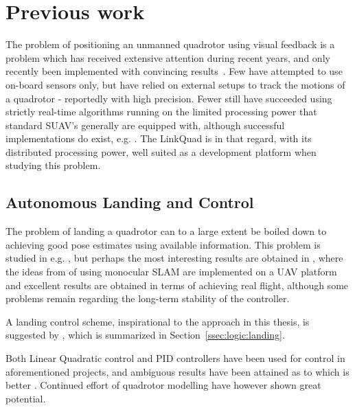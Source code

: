 \section{Previous work}
\label{sec:previouswork}

    The problem of positioning an unmanned quadrotor using
    visual feedback is a problem which has received extensive attention
    during recent years, and only recently been implemented with convincing
    results~\citep{DBLP:conf/icra/BloschWSS10,weiss11monocular}.
    Few have attempted to use on-board sensors only, but have relied on
    external setups to track the motions of a quadrotor - reportedly with high precision.
    Fewer still have succeeded using strictly real-time algorithms
    running on the limited processing power that standard
    SUAV's generally are equipped with, although successful implementations do exist, e.g. \citep{Rudol10}.
    The LinkQuad is in that regard, with its distributed processing power, well suited
    as a development platform when studying this problem.

    \subsection{Autonomous Landing and Control}
    The problem of landing a quadrotor can to a large extent be boiled
    down to achieving good pose estimates using available information.
    This problem is studied in e.g. \citep{mellinger10perching,brockers:803111},
    but perhaps the most interesting results are obtained in \citep{DBLP:conf/icra/BloschWSS10,weiss11monocular},
    where the ideas from \citep{klein07parallel} of using monocular SLAM
    are implemented on a UAV platform and excellent results are obtained
    in terms of achieving real flight, although some problems remain regarding
    the long-term stability of the controller.

    A landing control scheme, inspirational to the approach in this thesis,
    is suggested by \citep{brockers:803111}, which is summarized in Section~\ref{ssec:logic:landing}.

    Both Linear Quadratic control and PID controllers have been used for control
    in aforementioned projects, and ambiguous results have been attained
    as to which is better \citep{bouabdallah04pid}. Continued effort of
    quadrotor modelling have however shown great potential\citep{bouabdallah07full}.

